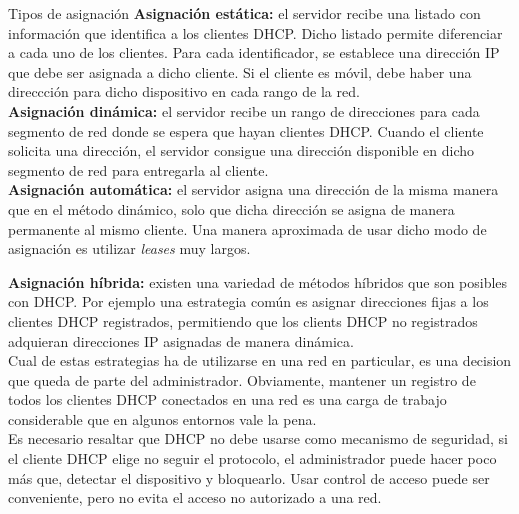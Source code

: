 \begin{frame}{Tipos de asignación} %
    \textbf{Asignación estática:} el servidor recibe una listado con
    información que identifica a los clientes DHCP. Dicho listado permite
    diferenciar a cada uno de los clientes. Para cada identificador, se
    establece una dirección IP que debe ser asignada a dicho cliente.
    Si el cliente es móvil, debe haber una direccción para dicho
    dispositivo en cada rango de la red. \\[0.2cm]

    \textbf{Asignación dinámica:} el servidor recibe un rango de direcciones
    para cada segmento de red donde se espera que hayan clientes DHCP. Cuando
    el cliente solicita una dirección, el servidor consigue una dirección
    disponible en dicho segmento de red para entregarla al cliente.\\[0.2cm]

    \textbf{Asignación automática:} el servidor asigna una dirección de la
    misma manera que en el método dinámico, solo que dicha dirección se asigna
    de manera permanente al mismo cliente. Una manera aproximada de usar dicho
    modo de asignación es utilizar \textit{leases} muy largos.\\[0.2cm]

    \framebreak

    \textbf{Asignación híbrida:} existen una variedad de métodos híbridos que
    son posibles con DHCP. Por ejemplo una estrategia común es asignar
    direcciones fijas a los clientes DHCP registrados, permitiendo que los
    clients DHCP no registrados adquieran direcciones IP asignadas de manera
    dinámica.\\[0.2cm]

    Cual de estas estrategias ha de utilizarse en una red en particular, es una
    decision que queda de parte del administrador. Obviamente, mantener un
    registro de todos los clientes DHCP conectados en una red es una carga de
    trabajo considerable que en algunos entornos vale la pena.\\[0.2cm]

    Es necesario resaltar que DHCP no debe usarse como mecanismo de seguridad,
    si el cliente DHCP elige no seguir el protocolo, el administrador puede
    hacer poco más que, detectar el dispositivo y bloquearlo. Usar control de acceso
    puede ser conveniente, pero no evita el acceso no autorizado a una
    red.\\[0.2cm]
    
\end{frame}

